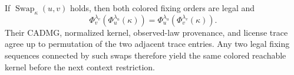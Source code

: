 If \(\operatorname{Swap}_{\kappa}(u,v)\) holds, then both colored fixing orders are legal and \[\Phi_v^{\lambda_v}\!\left(\Phi_u^{\lambda_u}(\kappa)\right)=\Phi_u^{\lambda_u}\!\left(\Phi_v^{\lambda_v}(\kappa)\right).\] Their CADMG, normalized kernel, observed-law provenance, and license trace agree up to permutation of the two adjacent trace entries. Any two legal fixing sequences connected by such swaps therefore yield the same colored reachable kernel before the next context restriction.